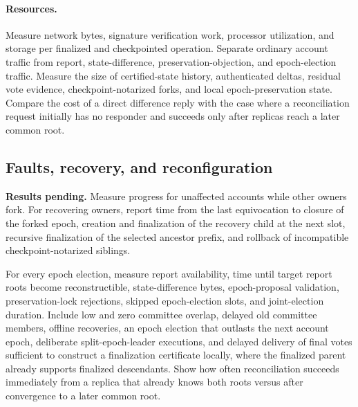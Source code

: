 \documentclass[10pt,twocolumn]{article}
\begin{document}
\paragraph{Resources.} Measure network bytes, signature verification work, processor utilization, and storage per finalized and checkpointed operation. Separate ordinary account traffic from report, state-difference, preservation-objection, and epoch-election traffic. Measure the size of certified-state history, authenticated deltas, residual vote evidence, checkpoint-notarized forks, and local epoch-preservation state. Compare the cost of a direct difference reply with the case where a reconciliation request initially has no responder and succeeds only after replicas reach a later common root.

\begin{center}
\end{center}

\subsection{Faults, recovery, and reconfiguration}
\noindent\textbf{Results pending.} Measure progress for unaffected accounts while other owners fork. For recovering owners, report time from the last equivocation to closure of the forked epoch, creation and finalization of the recovery child at the next slot, recursive finalization of the selected ancestor prefix, and rollback of incompatible checkpoint-notarized siblings.

For every epoch election, measure report availability, time until target report roots become reconstructible, state-difference bytes, epoch-proposal validation, preservation-lock rejections, skipped epoch-election slots, and joint-election duration. Include low and zero committee overlap, delayed old committee members, offline recoveries, an epoch election that outlasts the next account epoch, deliberate split-epoch-leader executions, and delayed delivery of final votes sufficient to construct a finalization certificate locally, where the finalized parent already supports finalized descendants. Show how often reconciliation succeeds immediately from a replica that already knows both roots versus after convergence to a later common root.
\end{document}
